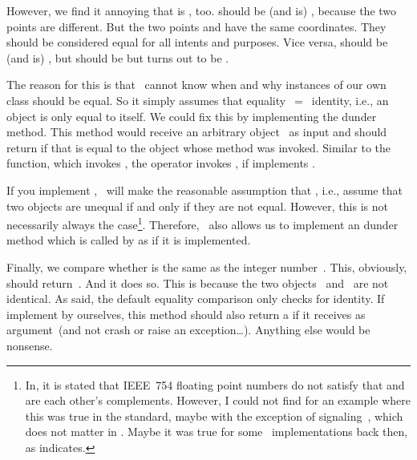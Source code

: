 However, we find it annoying that \pythonIdx{==} is , too.
 should be (and is) , because the two points are different.
But the two points  and  have the same coordinates.
They should be considered equal for all intents and purposes.
Vice versa,  should be (and is) , but  should be  but turns out to be .

The reason for this is that \python\ cannot know when and why instances of our own class should be equal.
So it simply assumes that equality~$=$~identity, i.e., an object is only equal to itself.
We could fix this by implementing the  dunder method.
This method would receive an arbitrary object~ as input and should return  if that is equal to the object whose method was invoked.
Similar to the  function, which invokes  , the  operator invokes , if  implements .

If you implement , \python\ will make the reasonable assumption that \pythonIdx{==}, i.e., assume that two objects are unequal if and only if they are not equal.
However, this is not necessarily always the case\footnote{%
In, it is stated that IEEE~754 floating point numbers do not satisfy that \pythonilIdx{==} and \pythonil{!=} are each other's complements. %
However, I could not find for an example where this was true in the standard, maybe with the exception of signaling~, which does not matter in \python. %
Maybe it was true for some \python\ implementations back then, as indicates.%
}. %
Therefore, \python\ also allows us to implement an  dunder method which is called by  as  if it is implemented\cite{PEP207}.

Finally, we compare whether  is the same as the integer number~.
This, obviously, should return~.
And it does so.
This is because the two objects~ and~ are not identical.
As said, the default equality comparison only checks for identity.
If implement  by ourselves, this method should also return a  if it receives  as argument~(and not crash or raise an exception\dots).
Anything else would be nonsense.

